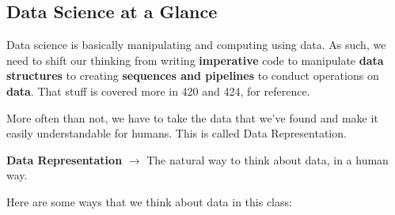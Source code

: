 \documentclass[english, 10pt]{article}
\begin{document}
\subsection{Data Science at a Glance}


Data science is basically manipulating and computing using data. As such, we need to shift our thinking from writing \textbf{imperative} code to manipulate \textbf{data structures} to creating \textbf{sequences and pipelines} to conduct operations on \textbf{data}. That stuff is covered more in 420 and 424, for reference.\newline

More often than not, we have to take the data that we've found and make it easily understandable for humans. This is called Data Representation.\newline

\begin{tcolorbox}[title=Definition:,colframe=red!75!black,colback=red!5!white,arc=0pt,fonttitle=\bfseries]
\textbf{Data Representation} $\rightarrow$ The natural way to think about data, in a human way.
\end{tcolorbox}

Here are some ways that we think about data in this class:\newline
\end{document}
